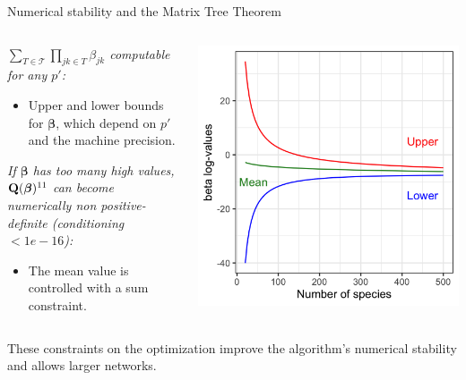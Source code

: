 \documentclass[11pt]{beamer}
\newcommand\betab{{\boldsymbol{\beta}}}
\newcommand\Qb{{\bf Q}}
\newcommand{\betabf}{{\boldsymbol{\beta}}}
\newcommand{\emphase}[1]{\textcolor{Complement}{#1}}
\begin{document}
   \begin{frame}{Numerical stability and the Matrix Tree Theorem}
   \begin{columns}
   \begin{column}{0.6\linewidth}
   \textit{$\sum_{T\in \mathcal{T}}\prod_{jk \in T} \beta_{jk}$ computable for any $p'$:}
  \begin{itemize} 
   \item  Upper and lower bounds for $\betab$, which depend on $p'$ and the machine precision.
   \end{itemize}
   \bigskip
   
\textit{ If $\betabf$ has too many high values, $\Qb(\betabf)^{11}$ can become numerically non positive-definite (conditioning$<1e-16$):}
      \begin{itemize}
   \item  The mean value is controlled with a sum constraint.
   \end{itemize}
 
   \end{column}
   \begin{column}{0.4\linewidth}
   \includegraphics[width=\linewidth]{images/beta_constraints.png}
   \end{column}
   \end{columns}
   \bigskip
   
   These constraints on the optimization improve the algorithm's \emphase{numerical stability} and allows larger networks.
   \end{frame}
\end{document}
